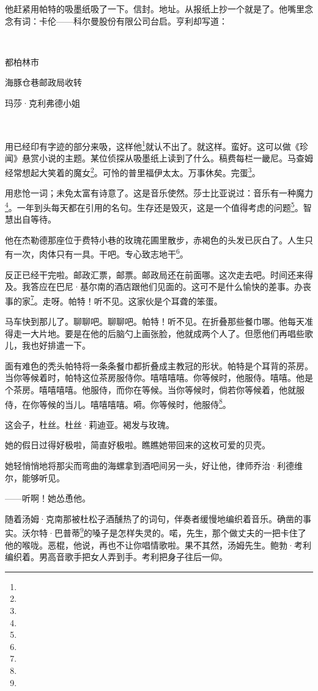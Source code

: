 \par 他赶紧用帕特的吸墨纸吸了一下。信封。地址。从报纸上抄一个就是了。他嘴里念念有词：卡伦——科尔曼股份有限公司台启。亨利却写道：
\par  
\par 都柏林市
\par 海豚仓巷邮政局收转
\par 玛莎·克利弗德小姐
\par  
\par 用已经印有字迹的部分来吸，这样他\footnote{}就认不出了。就这样。蛮好。这可以做《珍闻》悬赏小说的主题。某位侦探从吸墨纸上读到了什么。稿费每栏一畿尼。马查姆经常想起大笑着的魔女\footnote{}。可怜的普里福伊太太。万事休矣。完蛋\footnote{}。
\par 用悲怆一词；未免太富有诗意了。这是音乐使然。莎士比亚说过：音乐有一种魔力\footnote{}。一年到头每天都在引用的名句。生存还是毁灭，这是一个值得考虑的问题\footnote{}。智慧出自等待。
\par 他在杰勒德那座位于费特小巷的玫瑰花圃里散步，赤褐色的头发已灰白了。人生只有一次，肉体只有一具。干吧。专心致志地干\footnote{}。
\par 反正已经干完啦。邮政汇票，邮票。邮政局还在前面哪。这次走去吧。时间还来得及。我答应在巴尼·基尔南的酒店跟他们见面的。这可不是什么愉快的差事。办丧事的家\footnote{}。走呀。帕特！听不见。这家伙是个耳聋的笨蛋。
\par 马车快到那儿了。聊聊吧。聊聊吧。帕特！听不见。在折叠那些餐巾哪。他每天准得走一大片地。要是在他的后脑勺上画张脸，他就成两个人了。但愿他们再唱些歌儿，我也好排遣一下。
\par 面有难色的秃头帕特将一条条餐巾都折叠成主教冠的形状。帕特是个耳背的茶房。当你等候着时，帕特这位茶房服侍你。嘻嘻嘻嘻。你等候时，他服侍。嘻嘻。他是个茶房。嘻嘻嘻嘻。他服侍，而你在等候。当你等候时，倘若你等候着，他就服侍，在你等候的当儿。嘻嘻嘻嘻。嗬。你等候时，他服侍\footnote{}。
\par 这会子，杜丝。杜丝·莉迪亚。褐发与玫瑰。
\par 她的假日过得好极啦，简直好极啦。瞧瞧她带回来的这枚可爱的贝壳。
\par 她轻悄悄地将那尖而弯曲的海螺拿到酒吧间另一头，好让他，律师乔治·利德维尔，能够听见。
\par ——听啊！她怂恿他。
\par 随着汤姆·克南那被杜松子酒醺热了的词句，伴奏者缓慢地编织着音乐。确凿的事实。沃尔特·巴普蒂\footnote{}的嗓子是怎样失灵的。喏，先生，那个做丈夫的一把卡住了他的喉咙。恶棍，他说，再也不让你唱情歌啦。果不其然，汤姆先生。鲍勃·考利编织着。男高音歌手把女人弄到手。考利把身子往后一仰。
